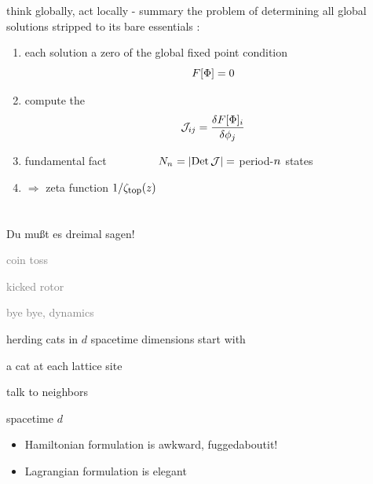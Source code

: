 \begin{frame}{think globally, act locally - summary}
\bigskip
the problem of determining all global solutions stripped
to its bare essentials :
\bigskip
\begin{enumerate}
              \item
each solution a zero of the global {\color{blue}fixed point} condition
\[
F[\Phi] = 0
\]
              \item
compute  the {\jacobianOrb}
\[
{\cal J}_{ij} =\frac{\delta F[\Phi]_i}{\delta \phi_j}
\]
              \item
{\color{blue}fundamental fact} ~~~~~~~~
\(
N_{n_{}} = |\mbox{\rm Det}\,{\cal J}| =
\)
 period-${n_{}}$ states

 \bigskip
              \item
\hfill $\Rightarrow$ {\color{blue}zeta function} $1/\zeta_{\mbox{\footnotesize top}} (z)$
            \end{enumerate}
\end{frame} %

\section[\catlatt]
 {\catlatt}
\label{s:catLatt}

\begin{frame}{}
\begin{bartlett}{
Du mu{\ss}t es dreimal sagen!
        }
\end{bartlett}
\vfill
\begin{enumerate}
              \item \textcolor{gray}{\small
coin toss
              \item
kicked rotor
                  }
              \item {\Large
\catlatt
                  }\textcolor{gray}{\small
              \item
bye bye, dynamics
                    }
            \end{enumerate}
\end{frame} %

\begin{frame}{herding cats in $d$ spacetime dimensions}
start with
\begin{block}{a cat at each lattice site}
\bigskip

talk to neighbors
\medskip

spacetime $d$\dmn\
~~~~~~~ {\color{blue}\Large \catlatt}
\end{block}

\vfill

\begin{itemize}
  \item {\scriptsize Hamiltonian formulation is awkward, fuggedaboutit!}
  \item Lagrangian formulation is elegant
\end{itemize}
\end{frame} %

